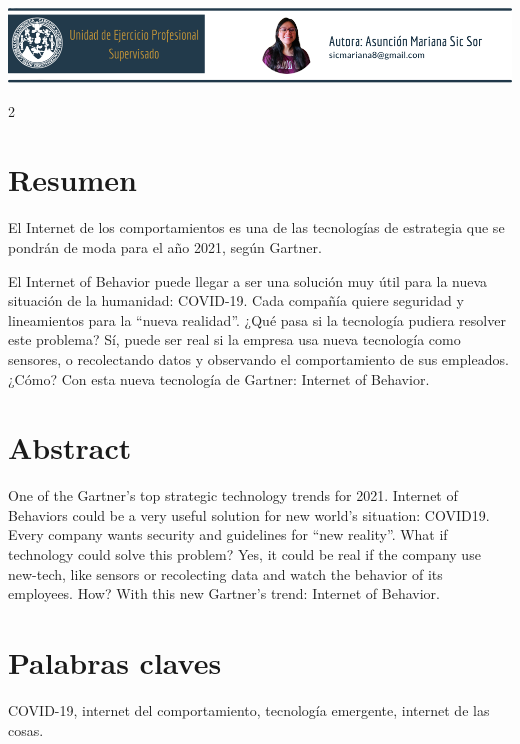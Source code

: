 \documentclass[12pt,spanish,Letterpaper,openany]{book}
\begin{document}
\begin{center}\includegraphics[width=1\linewidth]{images/mSic_image1} \end{center}

\begin {multicols}{2}

\hypertarget{resumen-6}{%
\section{Resumen}\label{resumen-6}}

El Internet de los comportamientos es una de las tecnologías de estrategia que se pondrán de moda para el año 2021, según Gartner.

El Internet of Behavior puede llegar a ser una solución muy útil para la nueva situación de la humanidad: COVID-19. Cada compañía quiere seguridad y lineamientos para la ``nueva realidad''. ¿Qué pasa si la tecnología pudiera resolver este problema? Sí, puede ser real si la empresa usa nueva tecnología como sensores, o recolectando datos y observando el comportamiento de sus empleados. ¿Cómo? Con esta nueva tecnología de Gartner: Internet of Behavior.

\hypertarget{abstract-6}{%
\section{Abstract}\label{abstract-6}}

One of the Gartner's top strategic technology trends for 2021.
Internet of Behaviors could be a very useful solution for new world's situation: COVID19. Every company wants security and guidelines for ``new reality''. What if technology could solve this problem? Yes, it could be real if the company use new-tech, like sensors or recolecting data and watch the behavior of its employees. How? With this new Gartner's trend: Internet of Behavior.

\hypertarget{palabras-claves-6}{%
\section{Palabras claves}\label{palabras-claves-6}}

COVID-19, internet del comportamiento, tecnología emergente, internet de las cosas.


\end{multicols}
\end{document}
